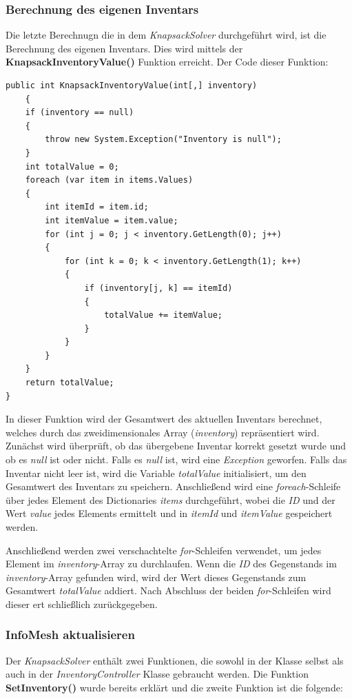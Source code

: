 \subsubsection{Berechnung des eigenen Inventars}
Die letzte Berechnugn die in dem \textit{KnapsackSolver} durchgeführt wird, ist die Berechnung des eigenen Inventars. Dies
wird mittels der \textbf{KnapsackInventoryValue()} Funktion erreicht. Der Code dieser Funktion:
\begin{lstlisting}[style=csharp, caption={Funktion um eigenes Inventar zu brechnen}]
public int KnapsackInventoryValue(int[,] inventory)
    {
    if (inventory == null)
    {
        throw new System.Exception("Inventory is null");
    }
    int totalValue = 0;
    foreach (var item in items.Values)
    {
        int itemId = item.id;
        int itemValue = item.value;
        for (int j = 0; j < inventory.GetLength(0); j++)
        {
            for (int k = 0; k < inventory.GetLength(1); k++)
            {
                if (inventory[j, k] == itemId)
                {
                    totalValue += itemValue;
                }
            }
        }
    }
    return totalValue;
}
\end{lstlisting}
In dieser Funktion wird der Gesamtwert des aktuellen Inventars berechnet, welches durch das zweidimensionales Array
(\textit{inventory}) repräsentiert wird. Zunächst wird überprüft, ob das übergebene Inventar korrekt gesetzt wurde und
ob es \textit{null} ist oder nicht. Falls es \textit{null} ist, wird eine \textit{Exception} geworfen. Falls das Inventar
nicht leer ist, wird die Variable \textit{totalValue} initialisiert, um den Gesamtwert des Inventars zu speichern.
Anschließend wird eine \textit{foreach}-Schleife über jedes Element des Dictionaries \textit{items} durchgeführt, wobei
die \textit{ID} und der Wert \textit{value} jedes Elements ermittelt und in \textit{itemId} und \textit{itemValue}
gespeichert werden.

Anschließend werden zwei verschachtelte \textit{for}-Schleifen verwendet, um jedes Element im \textit{inventory}-Array
zu durchlaufen. Wenn die \textit{ID} des Gegenstands im \textit{inventory}-Array gefunden wird, wird der Wert dieses
Gegenstands zum Gesamtwert \textit{totalValue} addiert. Nach Abschluss der beiden \textit{for}-Schleifen wird dieser
ert schließlich zurückgegeben.

\subsubsection{InfoMesh aktualisieren}
Der \textit{KnapsackSolver} enthält zwei Funktionen, die sowohl in der Klasse selbst als auch in der
\textit{InventoryController} Klasse gebraucht werden. Die Funktion \textbf{SetInventory()} wurde bereits erklärt und
die zweite Funktion ist die folgende:

